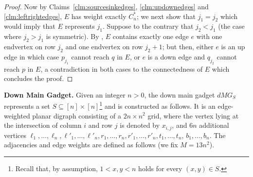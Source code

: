 \documentclass[a4paper,11pt]{article}
\theoremstyle{plain}
\newtheorem{identification rule}{Identification Rule}
\theoremstyle{definition}
\theoremstyle{remark}
\begin{document}
\begin{proof}
Now by Claims~\ref{clm:sourcesinkedges}, \ref{clm:updownedges} and \ref{clm:leftrightedges}, $E$ has weight exactly $C_n^*$; we next show that $j_1 = j_2$ which would imply that $E$ represents $j_1$. Suppose to the contrary that $j_2 < j_1$ (the case where $j_2 > j_1$ is symmetric). By , $E$ contains exactly one edge $e$ with one endvertex on row $j_2$ and one endvertex on row $j_2+1$; but then, either $e$ is an up edge in which case $p_{j_1}$ cannot reach $q$ in $E$, or $e$ is a down edge and $q_{j_2}$ cannot reach $p$ in $E$, a contradiction in both cases to the connectedness of $E$ which concludes the proof. 
\end{proof}


\noindent
\textbf{Down Main Gadget.} Given an integer $n > 0$, the down main gadget $dMG_S$ represents a set $S \subseteq [n] \times [n]$\footnote{Recall that, by assumption, $1 < x,y< n$ holds for every $(x,y) \in S$.} and is constructed as follows. It is an edge-weighted planar digraph consisting of a $2n \times n^2$ grid, where the vertex lying at the intersection of column $i$ and row $j$ is denoted by $x_{i,j}$, and $6n$ additional vertices $\ell_1,\ldots,\ell_n,\ell'_1,\ldots,\ell'_n,r_1,\ldots,r_n,r'_1,\ldots,r'_n,t_1,\ldots,t_n$, $b_1,\ldots,b_n$. The adjacencies and edge weights are defined as follows (we fix $M=13n^2$). 
\end{document}
